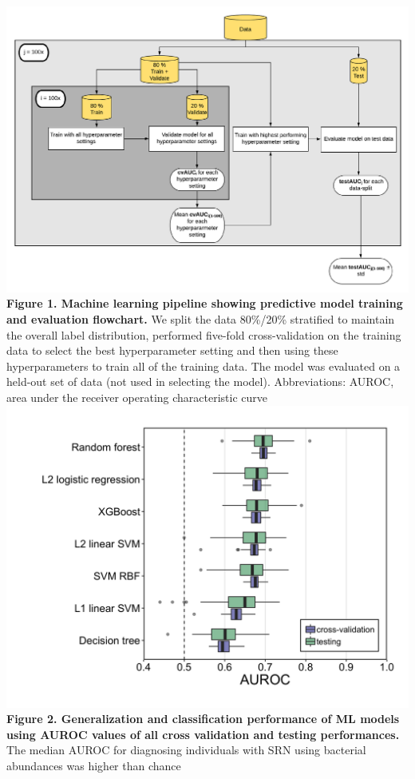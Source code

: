 \documentclass[11pt,]{article}
\begin{document}
\includegraphics{Figure_1} \textbf{Figure 1. Machine learning pipeline
showing predictive model training and evaluation flowchart. } We split
the data 80\%/20\% stratified to maintain the overall label
distribution, performed five-fold cross-validation on the training data
to select the best hyperparameter setting and then using these
hyperparameters to train all of the training data. The model was
evaluated on a held-out set of data (not used in selecting the model).
Abbreviations: AUROC, area under the receiver operating characteristic
curve \newpage
\includegraphics{Figure_2.png} \textbf{Figure 2. Generalization and
classification performance of ML models using AUROC values of all cross
validation and testing performances. } The median AUROC for diagnosing
individuals with SRN using bacterial abundances was higher than chance
\end{document}
